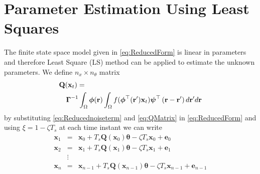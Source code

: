 \documentclass[12pt]{iopart}
\begin{document}
\section{Parameter Estimation Using Least Squares}\label{LeastSquaresAppendix} 
The finite state space model  given in \ref{eq:ReducedForm} is linear in parameters and therefore Least Square (LS) method can be applied to estimate the unknown parameters. We define $n_x \times n_{\theta}$ matrix
\begin{eqnarray}\label{eq:QMatrix}
	\lefteqn {\mathbf{Q}(\mathbf{x}_t)=} \\
&&\boldsymbol{\Gamma}^{ - 1}\int_\Omega {\boldsymbol{\phi}(\mathbf{r}) \int_\Omega {f(\boldsymbol{\phi}^{\top}(\mathbf{r}')\mathbf{x}_t)\boldsymbol{\psi}^{\top} \left(\mathbf{r}-\mathbf{r}'\right)d\mathbf{r}'} d\mathbf{r}}\nonumber
\end{eqnarray}
by substituting \ref{eq:Reducednoiseterm} and \ref{eq:QMatrix} in \ref{eq:ReducedForm} and using $\xi = 1-\zeta T_s$ at each time instant we can write
\begin{eqnarray}
	\mathbf x_{1}&=&\mathbf x_{0}+T_s \mathbf Q(\mathbf x_0) \boldsymbol{\theta}-\zeta T_s\mathbf x_0+\mathbf e_0 \nonumber \\
	\mathbf x_{2}&=&\mathbf x_{1}+T_s \mathbf Q(\mathbf x_1) \boldsymbol{\theta}-\zeta T_s\mathbf x_1+\mathbf e_1\nonumber\\
	&\vdots& \\
	\mathbf x_{n}&=&\mathbf x_{n-1}+T_s \mathbf Q(\mathbf x_{n-1}) \boldsymbol{\theta}-\zeta T_s\mathbf x_{n-1}+\mathbf e_{n-1} \nonumber
\end{eqnarray}
\end{document}
